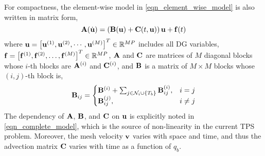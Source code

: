 For compactness, the element-wise model in \cref{eqn_element_wise_model} is also written in matrix form,
\begin{equation}
    \mathbf{A}(\dot{\mathbf{u}}) = \left(\mathbf{B}(\mathbf{u}) + \mathbf{C}(t,\mathbf{u})\right)\mathbf{u} + \mathbf{f}(t)\label{eqn_complete_model}
\end{equation}
where $\mathbf{u} = \left[\mathbf{u}^{(1)},\mathbf{u}^{(2)},\cdots,\mathbf{u}^{(M)}\right]^T\in\mathbb{R}^{MP}$ includes all DG variables, $\mathbf{f}=\left[\mathbf{f}^{(1)},\mathbf{f}^{(2)},\dots,\mathbf{f}^{(M)}\right]^T\in\mathbb{R}^{MP}$, $\mathbf{A}$ and $\mathbf{C}$ are matrices of $M$ diagonal blocks whose $i$-th blocks are $\mathbf{A}^{(i)}$ and $\mathbf{C}^{(i)}$, and $\mathbf{B}$ is a matrix of $M\times M$ blocks whose $(i,j)$-th block is,
\begin{equation}
    \mathbf{B}_{ij} = \begin{cases}
            \mathbf{B}^{(i)} + \sum_{j\in\mathcal{N}_i\cup\left\{T_b\right\}}\mathbf{B}^{(i)}_{ij}, & i=j\\
            \mathbf{B}^{(j)}_{ij}, & i\neq j
        \end{cases}
\end{equation}
The dependency of $\mathbf{A}$, $\mathbf{B}$, and $\mathbf{C}$ on $\mathbf{u}$ is explicitly noted in \cref{eqn_complete_model}, which is the source of non-linearity in the current TPS problem. Moreover, the mesh velocity $\mathbf{v}$ varies with space and time, and thus the advection matrix $\mathbf{C}$ varies with time as a function of $q_b$.





